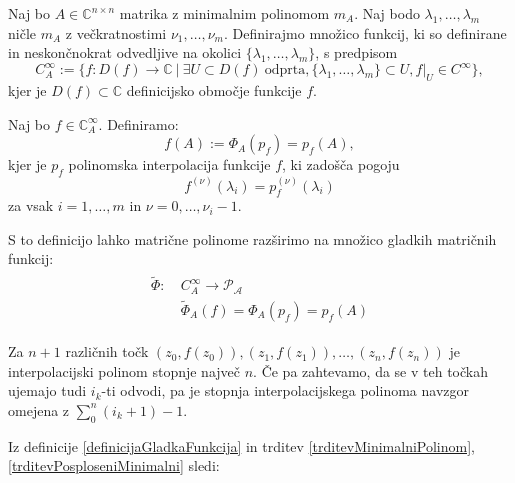 \documentclass[mat1]{fmfdelo}
\newcommand{\C}{\mathbb C}
\begin{document}
Naj bo $A \in \C^{n \times n}$ matrika z minimalnim polinomom $m_A$. Naj bodo $\lambda_1, \ldots, \lambda_m$ ničle $m_A$ z večkratnostimi $\nu_1, \ldots, \nu_m$. Definirajmo množico funkcij, ki so definirane in neskončnokrat odvedljive na okolici $\{\lambda_1, \ldots, \lambda_m\}$, s predpisom
\begin{equation}
    C_A^\infty := \{ f: D(f) \rightarrow \C\ |\ \exists U \subset D(f)\ \text{odprta}, \{\lambda_1, \ldots, \lambda_m\} \subset U, f|_U \in C^\infty \},
\end{equation}
kjer je $D(f) \subset \C$ definicijsko območje funkcije $f$.
\begin{definicija} \label{definicijaGladkaFunkcija}
    Naj bo $f \in \C_A^\infty$. Definiramo:
    \begin{equation}
        f(A) := \Phi_A(p_f) = p_f(A),
    \end{equation}
    kjer je $p_f$ polinomska interpolacija funkcije $f$, ki zadošča pogoju
    \begin{equation}
        f^{(\nu)}(\lambda_i) = p_f^{(\nu)}(\lambda_i)
    \end{equation}
    za vsak $i = 1, \ldots, m$ in $\nu = 0, \ldots, \nu_i-1$.
\end{definicija}
S to definicijo lahko matrične polinome razširimo na množico gladkih matričnih funkcij:
\begin{align}
    \begin{split}
        \widetilde{\Phi} :\ &C_A^\infty \longrightarrow \mathcal{P_A} \\
        &\widetilde{\Phi}_A(f) = \Phi_A(p_f) = p_f(A)
    \end{split}
\end{align}
\begin{opomba}
    Za $n+1$ različnih točk $(z_0, f(z_0)), (z_1, f(z_1)), \ldots, (z_n, f(z_n))$ je interpolacijski polinom stopnje največ $n$. Če pa zahtevamo, da se v teh točkah ujemajo tudi $i_k$-ti odvodi, pa je stopnja interpolacijskega polinoma navzgor omejena z $\sum_0^n (i_k + 1) - 1$.
\end{opomba}
Iz definicije \ref{definicijaGladkaFunkcija} in trditev \ref{trditevMinimalniPolinom}, \ref{trditevPosploseniMinimalni} sledi:
\end{document}
